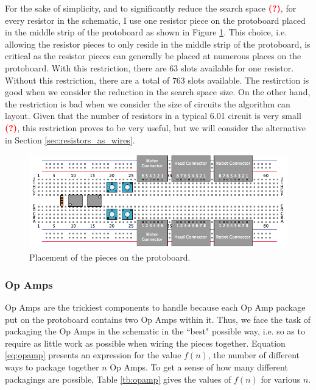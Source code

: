 For the sake of simplicity, and to significantly reduce the search space
\textcolor{red}{\textbf{(?)}}, for every resistor in the schematic, I use one
resistor piece on the protoboard placed in the middle strip of the protoboard
as shown in Figure \ref{fig:piece_placement}. This choice, i.e. allowing the
resistor pieces to only reside in the middle strip of the protoboard, is critical
as the resistor pieces can generally be placed at numerous places on the protoboard.
With this restriction, there are $63$ slots available for one resistor. Without
this restriction, there are a total of $763$ slots available. The restirction is
good when we consider the reduction in the search space size. On the other hand,
the restriction is bad when we
consider the size of circuits the algorithm can layout. Given that the number
of resistors in a typical 6.01 circuit is very
small \textcolor{red}{\textbf{(?)}}, this restriction proves
to be very useful, but we will consider the alternative in Section
\ref{sec:resistors_as_wires}.

\begin{figure}
\begin{center}
\includegraphics[width=\linewidth]{Images/piece_placement_options.png}
\caption{Placement of the pieces on the protoboard.}
\end{center}
\label{fig:piece_placement}
\end{figure}

\subsubsection{Op Amps}

Op Amps are the trickiest components to handle because each Op Amp package put
on the protoboard contains two Op Amps within it. Thus, we face the task of
packaging the Op Amps in the schematic in the ``best" possible way, i.e. so as
to require as little work as possible when wiring the pieces together. Equation
\ref{eq:opamp} presents an expression for the value $f(n)$, the number of
different ways
to package together $n$ Op Amps. To get a sense of how many different packagings
are possible, Table \ref{tb:opamp} gives the values of $f(n)$ for various $n$.

